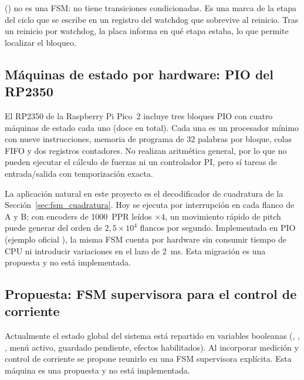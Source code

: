  () no es una FSM: no tiene transiciones condicionadas. Es una marca de la etapa del ciclo que se escribe en un registro del watchdog que sobrevive al reinicio. Tras un reinicio por watchdog, la placa informa en qué etapa estaba, lo que permite localizar el bloqueo.

\subsection{Máquinas de estado por hardware: PIO del RP2350}
\label{sec:fsm_pio}

El RP2350 de la Raspberry Pi Pico~2 incluye tres bloques PIO con cuatro máquinas de estado cada uno (doce en total). Cada una es un procesador mínimo con nueve instrucciones, memoria de programa de 32 palabras por bloque, colas FIFO y dos registros contadores. No realizan aritmética general, por lo que no pueden ejecutar el cálculo de fuerzas ni un controlador PI, pero sí tareas de entrada/salida con temporización exacta.

La aplicación natural en este proyecto es el decodificador de cuadratura de la Sección~\ref{sec:fsm_cuadratura}. Hoy se ejecuta por interrupción en cada flanco de A y B; con encoders de 1000~PPR leídos $\times 4$, un movimiento rápido de pitch puede generar del orden de $2{,}5 \times 10^4$ flancos por segundo. Implementada en PIO (ejemplo oficial ), la misma FSM cuenta por hardware sin consumir tiempo de CPU ni introducir variaciones en el lazo de 2~ms. Esta migración es una propuesta y no está implementada.

\subsection{Propuesta: FSM supervisora para el control de corriente}
\label{sec:fsm_supervisora}

Actualmente el estado global del sistema está repartido en variables booleanas (, , , menú activo, guardado pendiente, efectos habilitados). Al incorporar medición y control de corriente se propone reunirlo en una FSM supervisora explícita. Esta máquina es una propuesta y no está implementada.

